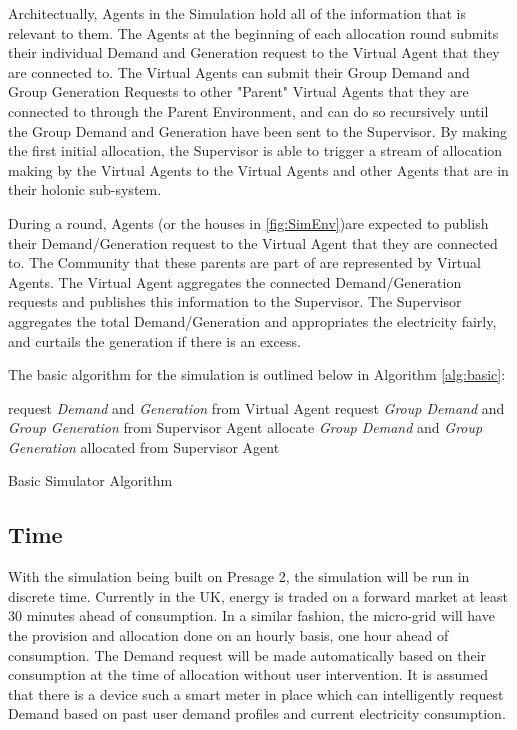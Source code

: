 Architectually, Agents in the Simulation hold all of the information that is relevant to them. The Agents at the beginning of each allocation round submits their individual Demand and Generation request to the Virtual Agent that they are connected to. The Virtual Agents can submit their Group Demand and Group Generation Requests to other "Parent" Virtual Agents that they are connected to through the Parent Environment, and can do so recursively until the Group Demand and Generation have been sent to the Supervisor. By making the first initial allocation, the Supervisor is able to trigger a stream of allocation making by the Virtual Agents to the Virtual Agents and other Agents that are in their holonic sub-system.

\clearpage
During a round, Agents (or the houses in \ref{fig:SimEnv})are expected to publish their Demand/Generation request to the Virtual Agent that they are connected to. The Community that these parents are part of are represented by Virtual Agents. The Virtual Agent aggregates the connected Demand/Generation requests and publishes this information to the Supervisor. The Supervisor aggregates the total Demand/Generation and appropriates the electricity fairly, and curtails the generation if there is an excess.

The basic algorithm for the simulation is outlined below in Algorithm \ref{alg:basic}: \\

\begin{algorithm}[H]
	 {
		request \textit{Demand} and \textit{Generation} from Virtual Agent\;
	}
	 {
		request \textit{Group Demand} and \textit{Group Generation} from Supervisor Agent\;
	}
	 {
		allocate \textit{Group Demand} and \textit{Group Generation} allocated from Supervisor Agent\;
	}
	\caption{Basic Simulator Algorithm}
	\label{alg:basic}
\end{algorithm}

\subsection*{Time}
With the simulation being built on Presage 2, the simulation will be run in discrete time. Currently in the UK, energy is traded on a forward market at least 30 minutes ahead of consumption. In a similar fashion, the micro-grid will have the provision and allocation done on an hourly basis, one hour ahead of consumption. The Demand request will be made automatically based on their consumption at the time of allocation without user intervention. It is assumed that there is a device such a smart meter in place which can intelligently request Demand based on past user demand profiles and current electricity consumption. 

